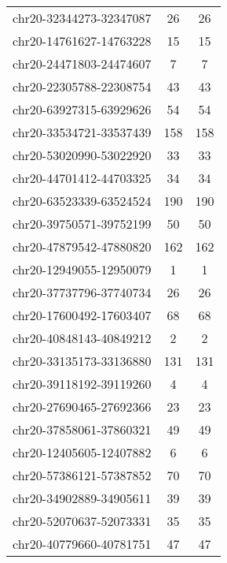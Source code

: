 \begin{longtable}{lSS}
	chr20-32344273-32347087 & 26   & 26                              \\
	chr20-14761627-14763228 & 15   & 15                              \\
	chr20-24471803-24474607 & 7    & 7                               \\
	chr20-22305788-22308754 & 43   & 43                              \\
	chr20-63927315-63929626 & 54   & 54                              \\
	chr20-33534721-33537439 & 158  & 158                             \\
	chr20-53020990-53022920 & 33   & 33                              \\
	chr20-44701412-44703325 & 34   & 34                              \\
	chr20-63523339-63524524 & 190  & 190                             \\
	chr20-39750571-39752199 & 50   & 50                              \\
	chr20-47879542-47880820 & 162  & 162                             \\
	chr20-12949055-12950079 & 1    & 1                               \\
	chr20-37737796-37740734 & 26   & 26                              \\
	chr20-17600492-17603407 & 68   & 68                              \\
	chr20-40848143-40849212 & 2    & 2                               \\
	chr20-33135173-33136880 & 131  & 131                             \\
	chr20-39118192-39119260 & 4    & 4                               \\
	chr20-27690465-27692366 & 23   & 23                              \\
	chr20-37858061-37860321 & 49   & 49                              \\
	chr20-12405605-12407882 & 6    & 6                               \\
	chr20-57386121-57387852 & 70   & 70                              \\
	chr20-34902889-34905611 & 39   & 39                              \\
	chr20-52070637-52073331 & 35   & 35                              \\
	chr20-40779660-40781751 & 47   & 47                              \\

\end{longtable}
